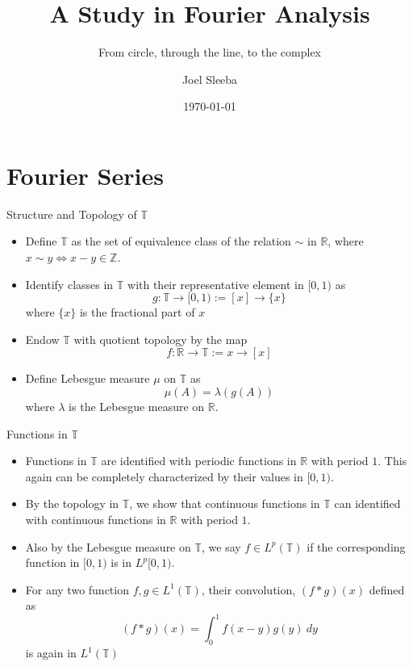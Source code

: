 \documentclass[compress]{beamer}
\title{A Study in Fourier Analysis}
\subtitle{From circle, through the line, to the complex}
\author{Joel Sleeba}
\institute{IISER Thiruvananthapuram}
\date{\today}
\newcommand{\R}{\mathbb R}
\newcommand{\T}{\mathbb T}
\begin{document}
\begin{frame}
  \maketitle
\end{frame}


\section{Fourier Series}

\begin{frame}{Structure and Topology of $\mathbb{T}$}{}
  \begin{itemize}
    \item Define $\mathbb{T}$ as the set of equivalence class of the relation $\sim$ in $\R$, where $x\sim y \iff x-y \in \mathbb{Z}$. 
    \pause
  \item Identify classes in $\mathbb{T}$ with their representative element in $[0, 1)$ as
      \begin{equation}
        g: \T \to [0, 1) := [x] \to \{x\} 
        \label{eqn:identify_T_with_I}
      \end{equation}
    where $\{x\}$ is the fractional part of $x$
    \pause
    \item Endow $\mathbb{T}$ with quotient topology by the map 
      \begin{equation}
        f: \mathbb{R} \to \mathbb{T}:= x \to [x]
        \label{eqn:Topology_on_T}
      \end{equation}
    \pause
    \item Define Lebesgue measure $\mu$ on $\mathbb{T}$ as
      \begin{equation}
        \mu(A) = \lambda(g(A))
        \label{eq:measure_on_T}
      \end{equation}
      where $\lambda$ is the Lebesgue measure on $\R$.
  \end{itemize}
\end{frame}

\begin{frame}{Functions in $\T$}
  \begin{itemize}
    \item Functions in $\T$ are identified with periodic functions in $\R$ with period $1$. This again can be completely characterized by their values in $[0,1)$.
    \pause
    \item By the topology in $\T$, we show that continuous functions in $\T$ can identified with continuous functions in $\R$ with period $1$.
    \pause
    \item Also by the Lebesgue measure on $\T$, we say $f \in L^p(\T)$ if the corresponding function in $[0, 1)$ is in $L^p[0, 1)$.
    \pause
    \item For any two function $f, g \in L^1(\T)$, their convolution, $(f*g)(x)$ defined as
      \begin{equation}
        (f*g)(x) = \int_0^1 f(x-y)g(y) \ dy
        \label{eq:convolution_on_T}
      \end{equation}
    is again in $L^1(\T)$
  \end{itemize}
\end{frame}
\end{document}
